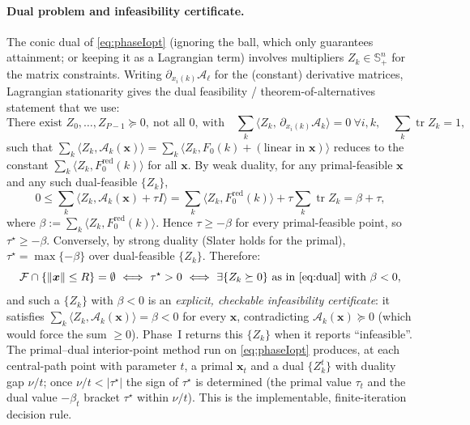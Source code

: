 \documentclass{amsart}
\newcommand{\Sym}{\mathbb{S}}
\newcommand{\tr}{\operatorname{tr}}
\begin{document}
\paragraph{Dual problem and infeasibility certificate.}
The conic dual of \eqref{eq:phaseIopt} (ignoring the ball, which only guarantees
attainment; or keeping it as a Lagrangian term) involves multipliers
$Z_k\in\Sym^n_+$ for the matrix constraints. Writing $\partial_{x_i(k)}\mathcal A_\ell$
for the (constant) derivative matrices, Lagrangian stationarity gives the dual
feasibility / theorem-of-alternatives statement that we use:
\begin{equation}\label{eq:dual}
  \text{There exist }Z_0,\dots,Z_{P-1}\succeq0,\ \text{not all }0,\ \text{with}\quad
  \sum_{k}\langle Z_k,\,\partial_{x_i(k)}\mathcal A_k\rangle=0\ \forall i,k,
  \quad \sum_k\tr Z_k=1,
\end{equation}
such that $\sum_k\langle Z_k,\mathcal A_k(\bm x)\rangle=\sum_k\langle
Z_k,F_0(k)+(\text{linear in }\bm x)\rangle$ reduces to the constant
$\sum_k\langle Z_k,F_0^{\mathrm{red}}(k)\rangle$ for all $\bm x$. By weak duality, for
any primal-feasible $\bm x$ and any such dual-feasible $\{Z_k\}$,
\[
  0\le\sum_k\langle Z_k,\mathcal A_k(\bm x)+\tau I\rangle
   =\sum_k\langle Z_k,F_0^{\mathrm{red}}(k)\rangle+\tau\sum_k\tr Z_k
   =\beta+\tau,
\]
where $\beta:=\sum_k\langle Z_k,F_0^{\mathrm{red}}(k)\rangle$. Hence $\tau\ge-\beta$
for every primal-feasible point, so $\tau^\star\ge-\beta$. Conversely, by strong
duality (Slater holds for the primal), $\tau^\star=\max\{-\beta\}$ over dual-feasible
$\{Z_k\}$. Therefore:
\[
  \mathcal F\cap\{\|\bm x\|\le R\}=\emptyset
  \ \Longleftrightarrow\ \tau^\star>0
  \ \Longleftrightarrow\ \exists\{Z_k\succeq0\}\ \text{as in \eqref{eq:dual}}\ \text{with}\ \beta<0,
\]
and such a $\{Z_k\}$ with $\beta<0$ is an \emph{explicit, checkable infeasibility
certificate}: it satisfies $\sum_k\langle Z_k,\mathcal A_k(\bm x)\rangle=\beta<0$ for
every $\bm x$, contradicting $\mathcal A_k(\bm x)\succeq0$ (which would force the sum
$\ge0$). Phase~I returns this $\{Z_k\}$ when it reports ``infeasible''. The
primal--dual interior-point method run on \eqref{eq:phaseIopt} produces, at each
central-path point with parameter $t$, a primal $\bm x_t$ and a dual $\{Z_k^t\}$ with
duality gap $\nu/t$; once $\nu/t<|\tau^\star|$ the sign of $\tau^\star$ is determined
(the primal value $\tau_t$ and the dual value $-\beta_t$ bracket $\tau^\star$ within
$\nu/t$). This is the implementable, finite-iteration decision rule.
\end{document}
